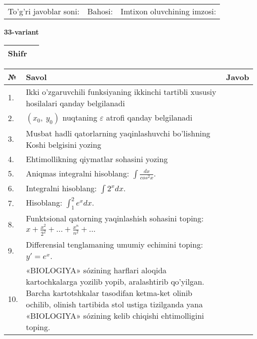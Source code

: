 \documentclass{article}
\begin{document}
  \vspace{1cm}
  
  \begin{tabular}{lll}
  To'g'ri javoblar soni: \underline{\hspace{1.5cm}} & 
  Bahosi: \underline{\hspace{1.5cm}} & 
  Imtixon oluvchining imzosi: \underline{\hspace{2cm}} \\
  \end{tabular}
  
  \egroup
  
  \newpage
  
  
  \textbf{33-variant}\\
  
  \bgroup
  \def\arraystretch{1.6} %
  
  \begin{tabular}{|m{5.7cm}|m{9.5cm}|}
  \hline
  Shifr & \\
  \hline
  \end{tabular}
  
  \vspace{1cm}
  
  \begin{tabular}{|m{0.7cm}|m{10cm}|m{4cm}|}
  \hline
  № & Savol & Javob \\
  \hline
  1. & Ikki o'zgaruvchili funksiyaning ikkinchi tartibli xususiy hosilalari qanday belgilanadi &  \\
  \hline
  2. & \((x_{0},\ y_{0})\) nuqtaning \(\varepsilon\) atrofi qanday belgilanadi &  \\
  \hline
  3. & Musbat hadli qatorlarning yaqinlashuvchi bo'lishning Koshi belgisini yozing &  \\
  \hline
  4. & Ehtimollikning qiymatlar sohasini yozing &  \\
  \hline
  5. & Aniqmas integralni hisoblang: \(\int \frac{dx}{cos^{2}x}\). &  \\
  \hline
  6. & Integralni hisoblang: \(\int {2^{x}dx}\). &  \\
  \hline
  7. & Hisoblang: \(\int_{1}^{2}{e^{x}dx}\). &  \\
  \hline
  8. & Funktsional qatorning yaqinlashish sohasini toping: \(x + \frac{x^{2}}{2^{2}} + ... + \frac{x^{n}}{n^{2}} + ...\) &  \\
  \hline
  9. & Differensial tenglamaning umumiy echimini toping: \(y' = e^{x}\). &  \\
  \hline
  10. & «BIOLOGIYA» sózining harflari aloqida kartochkalarga yozilib yopib, aralashtirib qo'yilgan. Barcha kartotshkalar tasodifan ketma-ket olinib ochilib, olinish tartibida stol ustiga tizilganda yana «BIOLOGIYA» sózining kelib chiqishi ehtimolligini toping. &  \\
  \hline
  \end{tabular}
  
\end{document}
